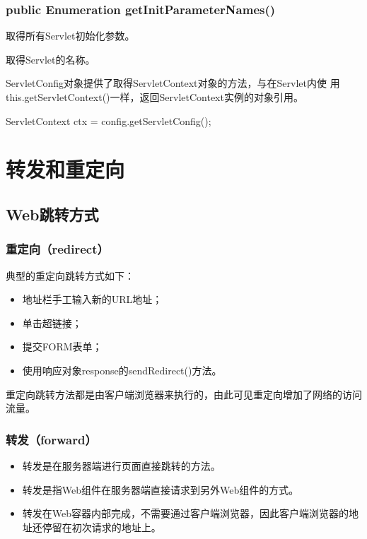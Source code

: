 \subsubsection{public Enumeration getInitParameterNames()}

取得所有Servlet初始化参数。


取得Servlet的名称。


{\kai ServletConfig对象提供了取得ServletContext对象的方法，与在Servlet内使
  用this.getServletContext()一样，返回ServletContext实例的对象引用。}

\begin{javaCode}
  ServletContext ctx = config.getServletConfig();
\end{javaCode}

\section{转发和重定向}

\subsection{Web跳转方式} 

\subsubsection{重定向（redirect）}

典型的重定向跳转方式如下：

\begin{itemize}
\item 地址栏手工输入新的URL地址；
\item 单击超链接；
\item 提交FORM表单；
\item 使用响应对象response的sendRedirect()方法。
\end{itemize}

{\Blue\hei 重定向跳转方法都是由客户端浏览器来执行的，由此可见重定向增加了网络的访问流量。}

\subsubsection{转发（forward）}

\begin{itemize}
\item 转发是在服务器端进行页面直接跳转的方法。
\item 转发是指Web组件在服务器端直接请求到另外Web组件的方式。
\item 转发在Web容器内部完成，不需要通过客户端浏览器，因此客户端浏览器的地址还停留在初次请求的地址上。
\end{itemize}

